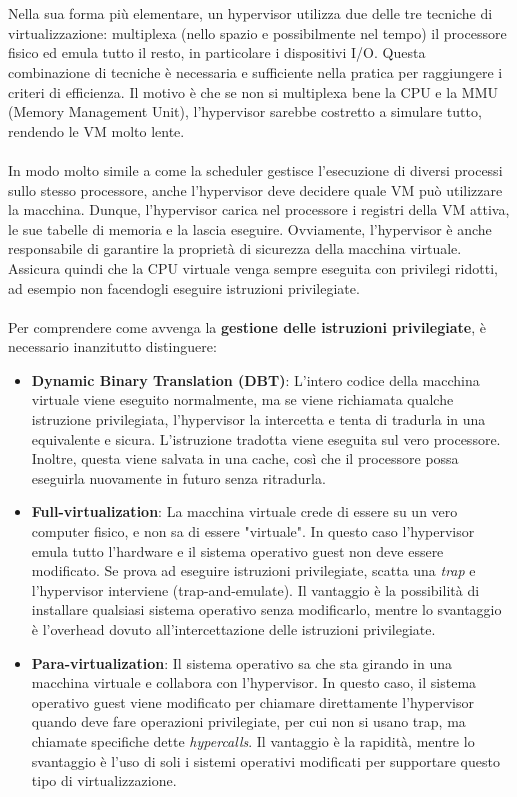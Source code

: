 \\
\\
Nella sua forma più elementare, un hypervisor utilizza due delle tre tecniche di virtualizzazione: multiplexa (nello spazio e possibilmente nel tempo) il processore fisico ed emula tutto il resto, in particolare i dispositivi I/O. Questa combinazione di tecniche è necessaria e sufficiente nella pratica per raggiungere i criteri
di efficienza. Il motivo è che se non si multiplexa bene la CPU e la MMU (Memory Management Unit), l’hypervisor sarebbe costretto a simulare tutto, rendendo le VM molto lente.
\\
\\
In modo molto simile a come la scheduler gestisce l'esecuzione di diversi processi sullo stesso processore, anche l’hypervisor deve decidere quale VM può utilizzare la macchina. Dunque, l'hypervisor carica nel processore i registri della VM attiva, le sue tabelle di memoria e la lascia eseguire. Ovviamente, l’hypervisor è anche responsabile di garantire la proprietà di sicurezza
della macchina virtuale. Assicura quindi che la CPU virtuale venga sempre eseguita con
privilegi ridotti, ad esempio non facendogli eseguire istruzioni privilegiate.
\\
\\
Per comprendere come avvenga la \textbf{gestione delle istruzioni privilegiate}, è necessario inanzitutto distinguere:
\begin{itemize}
    \item \textbf{Dynamic Binary Translation (DBT)}: L'intero codice della macchina virtuale viene eseguito normalmente, ma se viene richiamata qualche istruzione privilegiata, l'hypervisor la intercetta e tenta di tradurla in una equivalente e sicura. L'istruzione tradotta viene eseguita sul vero processore. Inoltre, questa viene salvata in una cache, così che il processore possa eseguirla nuovamente in futuro senza ritradurla.
    \item \textbf{Full-virtualization}: La macchina virtuale crede di essere su un vero computer fisico, e non sa di essere "virtuale". In questo caso l’hypervisor emula tutto l'hardware e il sistema operativo guest non deve essere modificato. Se prova ad eseguire istruzioni privilegiate, scatta una \textit{trap} e l’hypervisor interviene (trap-and-emulate). Il vantaggio è la possibilità di installare qualsiasi sistema operativo senza modificarlo, mentre lo svantaggio è l'overhead dovuto all'intercettazione delle istruzioni privilegiate.
    \item \textbf{Para-virtualization}: Il sistema operativo sa che sta girando in una macchina virtuale e collabora con l’hypervisor. In questo caso, il sistema operativo guest viene modificato per chiamare direttamente l’hypervisor quando deve fare operazioni privilegiate, per cui non si usano trap, ma chiamate specifiche dette \textit{hypercalls}. Il vantaggio è la rapidità, mentre lo svantaggio è l'uso di soli i sistemi operativi modificati per supportare questo tipo di virtualizzazione.
\end{itemize}
